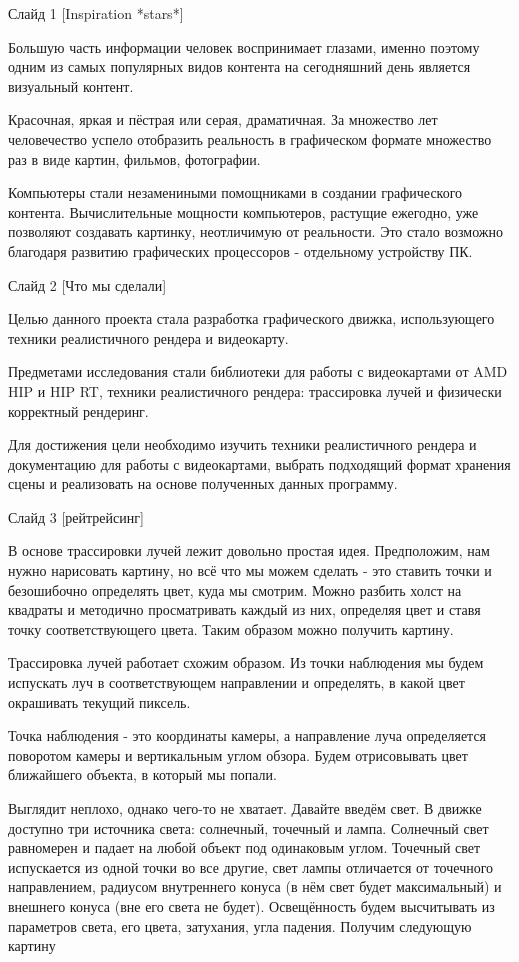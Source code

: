 \documentclass[a4paper,14pt]{extarticle}
\begin{document}
\linespread{1.3}
	\setlength{\parskip}{0cm}

Слайд 1 [Inspiration *stars*]

Большую часть информации человек воспринимает глазами, 
именно поэтому одним из самых популярных видов контента на сегодняшний день 
является визуальный контент.

Красочная, яркая и пёстрая или серая, драматичная. За множество лет человечество успело
отобразить реальность в графическом формате множество раз в виде картин, фильмов, фотографии.

Компьютеры стали незамениными помощниками в создании графического контента.
Вычислительные мощности компьютеров, растущие ежегодно, уже позволяют создавать картинку, неотличимую от реальности.
Это стало возможно благодаря развитию графических процессоров - отдельному устройству ПК.

Слайд 2 [Что мы сделали]

Целью данного проекта стала разработка графического движка, использующего техники реалистичного рендера и видеокарту.

Предметами исследования стали библиотеки для работы с видеокартами от AMD HIP и HIP RT, 
техники реалистичного рендера: трассировка лучей и физически корректный рендеринг.

Для достижения цели необходимо изучить техники реалистичного рендера и документацию для работы с видеокартами, 
выбрать подходящий формат хранения сцены и реализовать на основе полученных данных программу.

Слайд 3 [рейтрейсинг]

В основе трассировки лучей лежит довольно простая идея. Предположим, нам нужно нарисовать картину, но 
всё что мы можем сделать - это ставить точки и безошибочно определять цвет, куда мы смотрим.
Можно разбить холст на квадраты и методично просматривать каждый из них, определяя цвет и ставя точку соответствующего цвета.
Таким образом можно получить картину. 

Трассировка лучей работает схожим образом. Из точки наблюдения мы будем испускать луч в соответствующем направлении и определять, 
в какой цвет окрашивать текущий пиксель.  

Точка наблюдения - это координаты камеры, а направление луча определяется поворотом камеры и вертикальным углом обзора. 
Будем отрисовывать цвет ближайшего объекта, в который мы попали.

Выглядит неплохо, однако чего-то не хватает. Давайте введём свет. В движке доступно три источника света: 
солнечный, точечный и лампа. Солнечный свет равномерен и падает на любой объект под одинаковым углом. 
Точечный свет испускается из одной точки во все другие, свет лампы отличается от точечного направлением, 
радиусом внутреннего конуса (в нём свет будет максимальный) и внешнего конуса (вне его света не будет). 
Освещённость будем высчитывать из параметров света, его цвета, затухания, угла падения. Получим следующую картину
\end{document}
